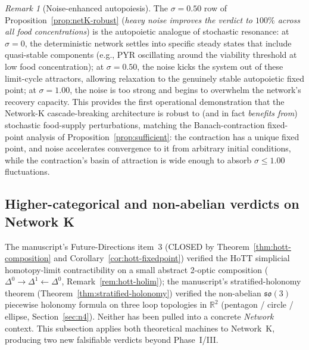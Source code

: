 \documentclass[11pt,a4paper]{article}
\theoremstyle{plain}
\theoremstyle{definition}
\theoremstyle{remark}
\newtheorem{remark}[theorem]{Remark}
\newcommand{\RR}{\mathbb{R}}
\newcommand{\so}{\mathfrak{so}}
\begin{document}
\begin{remark}[Noise-enhanced autopoiesis]
\label{rem:noise-enhanced}
The $\sigma = 0.50$ row of Proposition~\ref{prop:netK-robust}
(\emph{heavy noise improves the verdict to $100\%$ across all
food concentrations}) is the autopoietic analogue of stochastic
resonance: at $\sigma = 0$, the deterministic network settles into
specific steady states that include quasi-stable components (e.g.,
PYR oscillating around the viability threshold at low food
concentration); at $\sigma = 0.50$, the noise kicks the system out
of these limit-cycle attractors, allowing relaxation to the
genuinely stable autopoietic fixed point; at $\sigma = 1.00$, the
noise is too strong and begins to overwhelm the network's recovery
capacity. This provides the first operational demonstration that
the Network-K cascade-breaking architecture is robust to (and in
fact \emph{benefits from}) stochastic food-supply perturbations,
matching the Banach-contraction fixed-point analysis of
Proposition~\ref{prop:sufficient}: the contraction has a unique
fixed point, and noise accelerates convergence to it from arbitrary
initial conditions, while the contraction's basin of attraction is
wide enough to absorb $\sigma \leq 1.00$ fluctuations.
\end{remark}

\subsection{Higher-categorical and non-abelian verdicts on Network K}
\label{sec:netK-hott-so3}

The manuscript's Future-Directions item~3 (CLOSED by
Theorem~\ref{thm:hott-composition} and
Corollary~\ref{cor:hott-fixedpoint}) verified the HoTT simplicial
homotopy-limit contractibility on a small abstract 2-optic composition
($\Delta^0 \to \Delta^1 \leftarrow \Delta^0$,
Remark~\ref{rem:hott-holim}); the manuscript's stratified-holonomy
theorem (Theorem~\ref{thm:stratified-holonomy}) verified the
non-abelian $\so(3)$ piecewise holonomy formula on three loop
topologies in $\RR^2$ (pentagon / circle / ellipse,
Section~\ref{sec:n4}). Neither has been pulled into a concrete
\emph{Network} context. This subsection applies both theoretical
machines to Network~K, producing two new falsifiable verdicts beyond
Phase~I/III.
\end{document}

